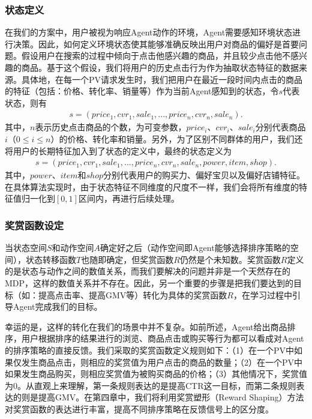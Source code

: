 \subsubsection{状态定义}
在我们的方案中，用户被视为响应Agent动作的环境，Agent需要感知环境状态进行决策。因此，如何定义环境状态使其能够准确反映出用户对商品的偏好是首要问题。假设用户在搜索的过程中倾向于点击他感兴趣的商品，并且较少点击他不感兴趣的商品。基于这个假设，我们将用户的历史点击行为作为抽取状态特征的数据来源。具体地，在每一个PV请求发生时，我们把用户在最近一段时间内点击的商品的特征（包括：价格、转化率、销量等）作为当前Agent感知到的状态，令$s$代表状态，则有
\begin{align}
   s = (price_1, cvr_1, sale_1, ..., price_n, cvr_n, sale_n). 
\end{align}
 其中，$n$表示历史点击商品的个数，为可变参数，$price_i$、$cvr_i$、$sale_i$分别代表商品$i$（$0 \leq i \leq n$）的价格、转化率和销量。另外，为了区别不同群体的用户，我们还将用户的长期特征加入到了状态的定义中，最终的状态定义为
\begin{align}
   s = (price_1, cvr_1, sale_1, ..., price_n, cvr_n, sale_n, power, item, shop). 
\end{align}
 其中，$power$、$item$和$shop$分别代表用户的购买力、偏好宝贝以及偏好店铺特征。在具体算法实现时，由于状态特征不同维度的尺度不一样，我们会将所有维度的特征值归一化到$[0,1]$区间内，再进行后续处理。

\subsubsection{奖赏函数设定}
当状态空间$S$和动作空间$A$确定好之后（动作空间即Agent能够选择排序策略的空间），状态转移函数$T$也随即确定，但奖赏函数$R$仍然是个未知数。奖赏函数$R$定义的是状态与动作之间的数值关系，而我们要解决的问题并非是一个天然存在的MDP，这样的数值关系并不存在。因此，另一个重要的步骤是把我们要达到的目标（如：提高点击率、提高GMV等）转化为具体的奖赏函数$R$，在学习过程中引导Agent完成我们的目标。

幸运的是，这样的转化在我们的场景中并不复杂。如前所述，Agent给出商品排序，用户根据排序的结果进行的浏览、商品点击或购买等行为都可以看成对Agent的排序策略的直接反馈。我们采取的奖赏函数定义规则如下：（1）在一个PV中如果仅发生商品点击，则相应的奖赏值为用户点击的商品的数量；（2）在一个PV中如果发生商品购买，则相应奖赏值为被购买商品的价格；（3）其他情况下，奖赏值为0。从直观上来理解，第一条规则表达的是提高CTR这一目标，而第二条规则表达的则是提高GMV。在第四章中，我们将利用奖赏塑形（Reward Shaping）方法对奖赏函数的表达进行丰富，提高不同排序策略在反馈信号上的区分度。

